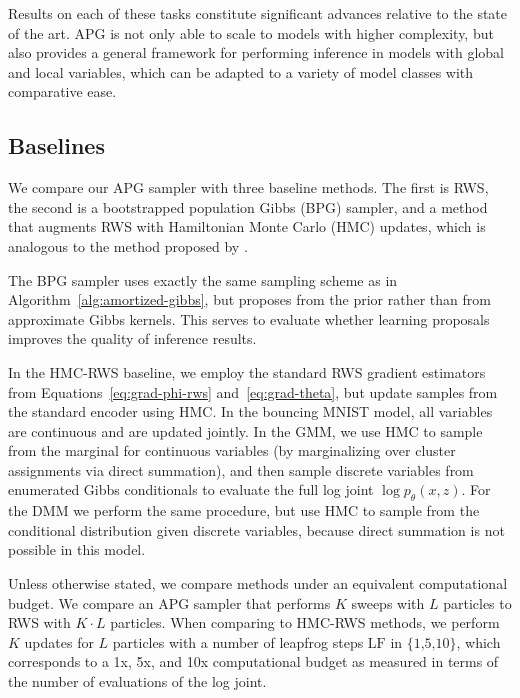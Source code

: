 \documentclass{article}
\theoremstyle{definition}
\begin{document}
Results on each of these tasks constitute significant advances relative to the state of the art. APG is not only able to scale to models with higher complexity, but also provides a general framework for performing inference in models with global and local variables, which can be adapted to a variety of model classes with comparative ease. 


\subsection{Baselines}
\label{sec:baselines}

We compare our APG sampler with three baseline methods. The first is RWS, the second is a bootstrapped population Gibbs (BPG) sampler, and a method that augments RWS with Hamiltonian Monte Carlo (HMC) updates, which is analogous to the method proposed by \citet{hoffman2017learning}.

The BPG sampler uses exactly the same sampling scheme as in Algorithm~\ref{alg:amortized-gibbs}, but proposes from the prior rather than from  approximate Gibbs kernels. This serves  to evaluate whether learning proposals improves the quality of inference results. 

In the HMC-RWS baseline, we employ the standard RWS gradient estimators from Equations~\ref{eq:grad-phi-rws} and~\ref{eq:grad-theta}, but update samples from the standard encoder using HMC. In the bouncing MNIST model, all variables are continuous and are updated jointly. In the GMM, we use HMC to sample from the marginal for continuous variables (by marginalizing over cluster assignments via direct summation), and then sample discrete variables from enumerated Gibbs conditionals to evaluate the full log joint $\log p_\theta(x,z)$. For the DMM we perform the same procedure, but use HMC to sample from the conditional distribution given discrete variables, because direct summation is not possible in this model. 


Unless otherwise stated, we compare methods under an equivalent computational budget. We compare an APG sampler that performs $K$ sweeps with $L$ particles to RWS with $K \cdot L$ particles. When comparing to HMC-RWS methods, we perform $K$ updates for $L$ particles with a number of leapfrog steps $\text{LF in \{1,5,10\}}$, which corresponds to a 1x, 5x, and 10x computational budget as measured in terms of the number of evaluations of the log joint. 
 
\end{document}
